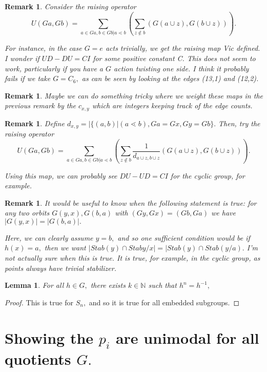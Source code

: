 \documentclass{amsart}
\newtheorem{lem}[subsubsection]{Lemma}
\newtheorem{rem}[subsubsection]{Remark}
\newcommand\BN{{\mathbb N}}
\begin{document}
\begin{rem}
Consider the raising operator $$U(Ga,Gb) = \sum_{a \in Ga,b \in Gb|a\lessdot b}^{}\left(\sum_{z\notin b}^{}(G(a\cup z),G(b \cup z))\right).$$

For instance, in the case $G = e$ acts trivially, we get the raising map Vic defined. I wonder if $UD -DU = CI$ for some positive constant C. This does not seem to work, particularly if you have a $G$ action twisting one side. I think it probably fails if we take $G = C_6,$ as can be seen by looking at the edges (13,1) and (12,2).
\end{rem}

\begin{rem}
Maybe we can do something tricky where we weight these maps in the previous remark by the $c_{x,y}$ which are integers keeping track of the edge counts.
\end{rem}

\begin{rem}
Define $d_{x,y} = |\{(a,b)|(a\lessdot b),Ga = Gx, Gy = Gb\}.$ Then, try the raising operator $$U(Ga,Gb) = \sum_{a \in Ga,b \in Gb|a\lessdot b}^{}\left(\sum_{z\notin b}^{} \frac{1}{d_{a\cup z,b\cup z}} (G(a\cup z),G(b \cup z))\right).$$

Using this map, we can probably see $DU-UD = CI$ for the cyclic group, for example.
\end{rem}
\begin{rem}

It would be useful to know when the following statement is true: for any two orbits $G(y,x),G(b,a)$ with $(Gy,Gx)= (Gb,Ga)$ we have $|G(y,x)| = |G(b,a)|.$

Here, we can clearly assume $y = b,$ and so one sufficient condition would be if $h(x) = a,$ then we want $|Stab(y) \cap Stab y/x| = |Stab(y)\cap Stab(y/a).$ I'm not actually sure when this is true. It is true, for example, in the cyclic group, as points always have trivial stabilizer.
\end{rem}

\begin{lem}
For all $h \in G,$ there exists $k \in \BN$ such that $h^n = h^{-1},$
\end{lem}
\begin{proof}
This is true for $S_n,$ and so it is true for all embedded subgroups.
\end{proof}

\section{Showing the $p_i$ are unimodal for all quotients $G.$}
\end{document}
